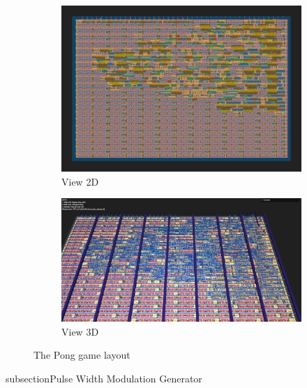 \begin{figure}[H]
    \centering
    \begin{subfigure}[b]{0.45\textwidth}
        \includegraphics[width=\linewidth]{Pictures/Result_Pong_2D_View.png}
        \caption{View 2D}\label{fig:pong_2D}
    \end{subfigure}
    \begin{subfigure}[b]{0.45\textwidth}
        \includegraphics[width=\linewidth]{Pictures/Result_Pong_3D_View.png}
        \caption{View 3D}\label{fig:pong_3D}
    \end{subfigure}
    \caption{The Pong game layout}\label{fig:Pong_Layout}
\end{figure}

subsection{Pulse Width Modulation Generator}


